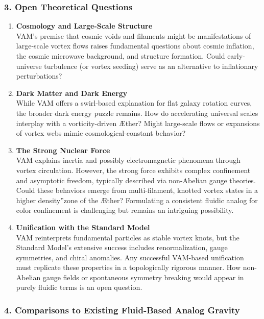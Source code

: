\documentclass[a4paper,12pt]{article}
\begin{document}
\subsubsection*{3. Open Theoretical Questions}

\begin{enumerate}
    \item \textbf{Cosmology and Large-Scale Structure} \\
    VAM's premise that cosmic voids and filaments might be manifestations of large-scale vortex flows raises fundamental questions about cosmic inflation, the cosmic microwave background, and structure formation. Could early-universe turbulence (or vortex seeding) serve as an alternative to inflationary perturbations?

    \item \textbf{Dark Matter and Dark Energy} \\
    While VAM offers a swirl-based explanation for flat galaxy rotation curves, the broader dark energy puzzle remains. How do accelerating universal scales interplay with a vorticity-driven Æther? Might large-scale flows or expansions of vortex webs mimic cosmological-constant behavior?

    \item \textbf{The Strong Nuclear Force} \\
    VAM explains inertia and possibly electromagnetic phenomena through vortex circulation. However, the strong force exhibits complex confinement and asymptotic freedom, typically described via non-Abelian gauge theories. Could these behaviors emerge from multi-filament, knotted vortex states in a higher \grqq density\textquotedblright zone of the Æther? Formulating a consistent fluidic analog for color confinement is challenging but remains an intriguing possibility.

    \item \textbf{Unification with the Standard Model} \\
    VAM reinterprets fundamental particles as stable vortex knots, but the Standard Model's extensive success includes renormalization, gauge symmetries, and chiral anomalies. Any successful VAM-based unification must replicate these properties in a topologically rigorous manner. How non-Abelian gauge fields or spontaneous symmetry breaking would appear in purely fluidic terms is an open question.
\end{enumerate}

\subsubsection*{4. Comparisons to Existing Fluid-Based Analog Gravity}
\end{document}

